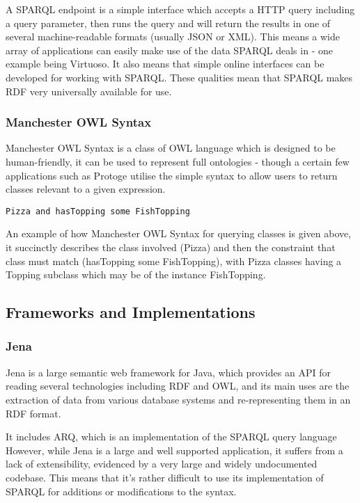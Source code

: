 \documentclass{article}
\begin{document}
A SPARQL endpoint is a simple interface which accepts a HTTP query including a
query parameter, then runs the query and will return the results in one of 
several machine-readable formats (usually JSON or XML). This means a wide array
of applications can easily make use of the data SPARQL deals in - one example
being Virtuoso. It also means that simple online interfaces can be developed for 
working with SPARQL. These qualities mean that SPARQL makes RDF very universally
available for use.

\subsubsection{Manchester OWL Syntax}

Manchester OWL Syntax is a class of OWL language which is designed to be
human-friendly, it can be used to represent full ontologies - though a certain
few applications such as Protoge utilise the simple syntax to allow users to
return classes relevant to a given expression.

\begin{lstlisting}
Pizza and hasTopping some FishTopping
\end{lstlisting}

An example of how Manchester OWL Syntax for querying classes is given above, it
succinctly describes the class involved (Pizza) and then the constraint that
class must match (hasTopping some FishTopping), with Pizza classes having a
Topping subclass which may be of the instance FishTopping.

\subsection{Frameworks and Implementations} 

\subsubsection{Jena}

Jena is a large semantic web framework for Java, which provides an API for
reading several technologies including RDF and OWL, and its main uses are
the extraction of data from various database systems and re-representing them in
an RDF format. 

It includes ARQ, which is an implementation of the SPARQL query language
However, while Jena is a large and well supported application, it suffers 
from a lack of extensibility, evidenced by a very large and widely undocumented 
codebase. This means that it's rather difficult to use its implementation of
SPARQL for additions or modifications to the syntax.
\end{document}
